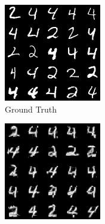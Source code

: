 \begin{figure}[H]
    \centering
    \begin{subfigure}[b]{0.24\textwidth}
        \centering
        \includegraphics[width=\textwidth]{figures/einsum/mnist/[2, 4]_ground_truth.png}
        \caption{Ground Truth}
    \end{subfigure}
    \begin{subfigure}[b]{0.24\textwidth}
        \centering
        \includegraphics[width=\textwidth]{figures/einsum/mnist/[2, 4]_EM.png}

\end{subfigure}
\end{figure}
